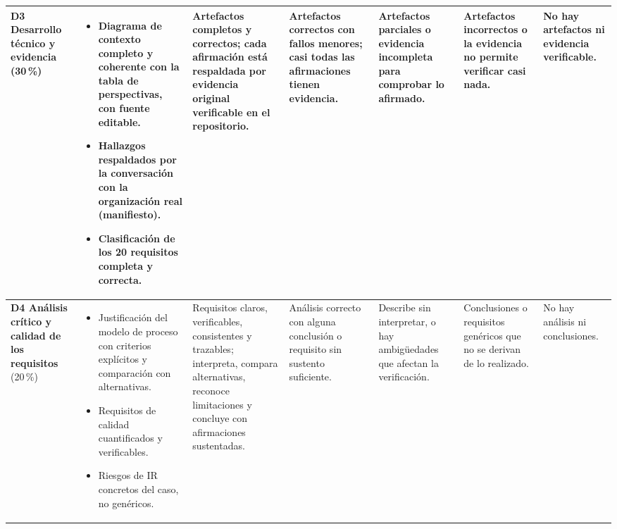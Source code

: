\documentclass[11pt]{article}
\begin{document}
\begin{landscape}
{\begin{longtable}{|L{2.4cm}|L{5.6cm}|L{3.1cm}|L{2.8cm}|L{2.8cm}|L{2.7cm}|L{2.1cm}|}
	\hline
	\textbf{D3 Desarrollo técnico y evidencia} (30\,\%) & \begin{itemize}[leftmargin=9pt,itemsep=0pt,topsep=0pt,parsep=0pt,partopsep=0pt,after=\vspace{-\baselineskip}]\item Diagrama de contexto completo y coherente con la tabla de perspectivas, con fuente editable.\item Hallazgos respaldados por la conversación con la organización real (manifiesto).\item Clasificación de los 20 requisitos completa y correcta.\end{itemize} & Artefactos completos y correctos; cada afirmación está respaldada por evidencia original verificable en el repositorio. & Artefactos correctos con fallos menores; casi todas las afirmaciones tienen evidencia. & Artefactos parciales o evidencia incompleta para comprobar lo afirmado. & Artefactos incorrectos o la evidencia no permite verificar casi nada. & No hay artefactos ni evidencia verificable.\\
	\hline
	\textbf{D4 Análisis crítico y calidad de los requisitos} (20\,\%) & \begin{itemize}[leftmargin=9pt,itemsep=0pt,topsep=0pt,parsep=0pt,partopsep=0pt,after=\vspace{-\baselineskip}]\item Justificación del modelo de proceso con criterios explícitos y comparación con alternativas.\item Requisitos de calidad cuantificados y verificables.\item Riesgos de IR concretos del caso, no genéricos.\end{itemize} & Requisitos claros, verificables, consistentes y trazables; interpreta, compara alternativas, reconoce limitaciones y concluye con afirmaciones sustentadas. & Análisis correcto con alguna conclusión o requisito sin sustento suficiente. & Describe sin interpretar, o hay ambigüedades que afectan la verificación. & Conclusiones o requisitos genéricos que no se derivan de lo realizado. & No hay análisis ni conclusiones.\\
	\hline

\end{longtable}}
\end{landscape}
\end{document}

